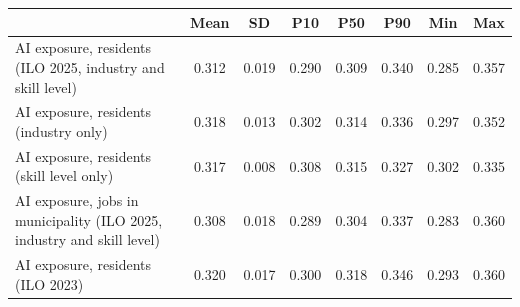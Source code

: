 {
\def\sym#1{\ifmmode^{#1}\else\(^{#1}\)\fi}
\begin{tabular}{l*{1}{ccccccc}}
\toprule
                    &        Mean&          SD&         P10&         P50&         P90&         Min&         Max\\
\midrule
AI exposure, residents (ILO 2025, industry and skill level)&       0.312&       0.019&       0.290&       0.309&       0.340&       0.285&       0.357\\
AI exposure, residents (industry only)&       0.318&       0.013&       0.302&       0.314&       0.336&       0.297&       0.352\\
AI exposure, residents (skill level only)&       0.317&       0.008&       0.308&       0.315&       0.327&       0.302&       0.335\\
AI exposure, jobs in municipality (ILO 2025, industry and skill level)&       0.308&       0.018&       0.289&       0.304&       0.337&       0.283&       0.360\\
AI exposure, residents (ILO 2023)&       0.320&       0.017&       0.300&       0.318&       0.346&       0.293&       0.360\\
\bottomrule
\end{tabular}
}
